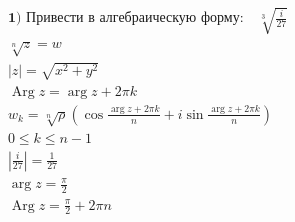 \documentclass[fleqn]{article}
\begin{document}
\[
\begin{array}{l}
\textbf{1) Привести в алгебраическую форму:} \quad \sqrt[3]{ \frac{i}{27} } \\
\sqrt[n]{z} = w \\
\left| z \right| = \sqrt{x^2 + y^2} \\
\operatorname{Arg} z = \arg z + 2\pi k \\
w_k = \sqrt[n]{\rho} \left( \cos \frac{\arg z + 2\pi k}{n} + i \sin \frac{\arg z + 2\pi k}{n} \right) \\
0\leq k \leq n - 1 \\

\left| \frac{i}{27} \right| = \frac{1}{27} \\
\arg z = \frac{\pi}{2} \\
\operatorname{Arg} z = \frac{\pi}{2} + 2 \pi n




\end{array}
\]
\end{document}
